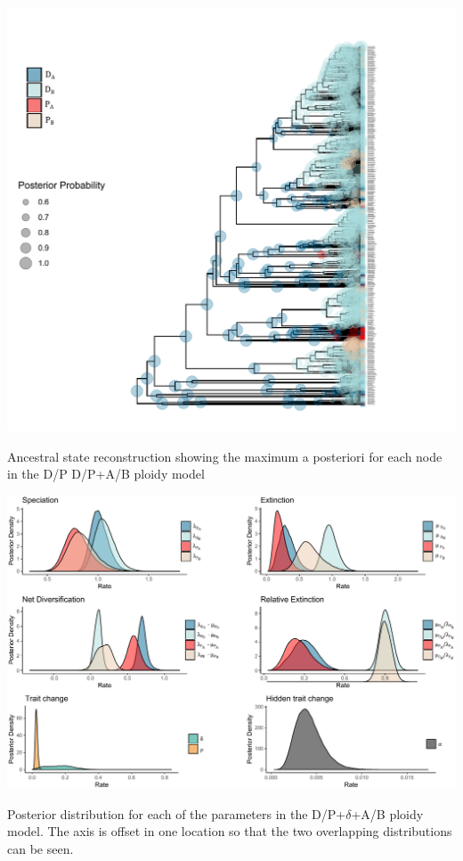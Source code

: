 \begin{suppfigure}
\includegraphics[width=\textwidth]{asrDPAB.pdf}
\caption{Ancestral state reconstruction showing the maximum a posteriori for each node in the D/P D/P+A/B ploidy model} %
\label{suppfigure:DPnodipABasr}
\end{suppfigure}

\begin{suppfigure}
\includegraphics[width=\textwidth]{hisseDPposteriordist.pdf}
\caption{Posterior distribution for each of the parameters in the D/P+$\delta$+A/B ploidy model.  The axis is offset in one location so that the two overlapping distributions can be seen.} %
\label{suppfigure:DPAB}
\end{suppfigure}

